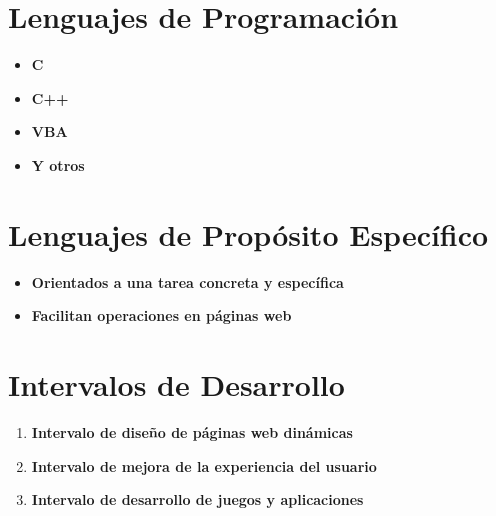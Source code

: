 \documentclass{article}
\begin{document}
\section*{Lenguajes de Programación}
\begin{itemize}
    \item \textbf{C}
    \item \textbf{C++}
    \item \textbf{VBA}
    \item \textbf{Y otros}
\end{itemize}

\section*{Lenguajes de Propósito Específico}
\begin{itemize}
    \item \textbf{Orientados a una tarea concreta y específica}
    \item \textbf{Facilitan operaciones en páginas web}
\end{itemize}

\section*{Intervalos de Desarrollo}
\begin{enumerate}
    \item \textbf{Intervalo de diseño de páginas web dinámicas}
    \item \textbf{Intervalo de mejora de la experiencia del usuario}
    \item \textbf{Intervalo de desarrollo de juegos y aplicaciones}
\end{enumerate}
\end{document}
